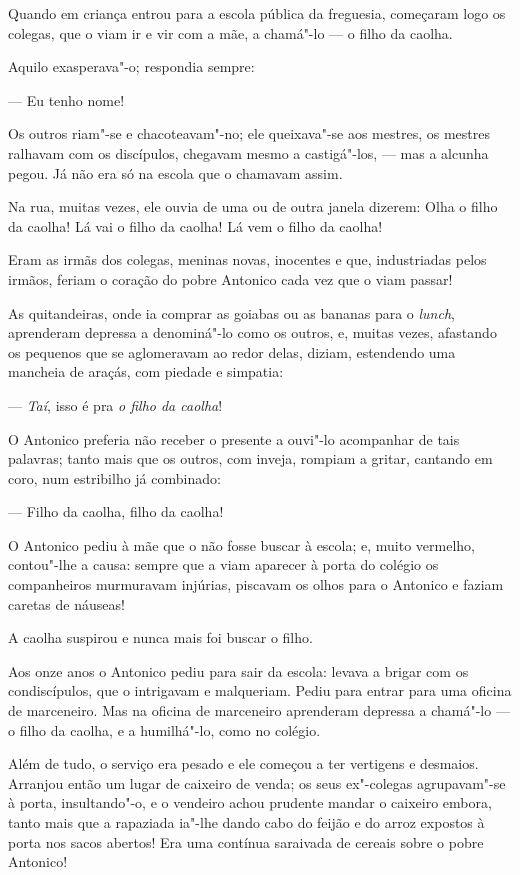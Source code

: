 Quando em criança entrou para a escola pública da freguesia, começaram
logo os colegas, que o viam ir e vir com a mãe, a chamá"-lo --- o filho
da caolha.

Aquilo exasperava"-o; respondia sempre:

--- Eu tenho nome!

Os outros riam"-se e chacoteavam"-no; ele queixava"-se aos mestres, os
mestres ralhavam com os discípulos, chegavam mesmo a castigá"-los, ---
mas a alcunha pegou. Já não era só na escola que o chamavam assim.

Na rua, muitas vezes, ele ouvia de uma ou de outra janela dizerem: Olha
o filho da caolha! Lá vai o filho da caolha! Lá vem o filho da caolha!

Eram as irmãs dos colegas, meninas novas, inocentes e que, industriadas
pelos irmãos, feriam o coração do pobre Antonico cada vez que o viam
passar!

As quitandeiras, onde ia comprar as goiabas ou as bananas para o
\emph{lunch}, aprenderam depressa a denominá"-lo como os outros, e,
muitas vezes, afastando os pequenos que se aglomeravam ao redor delas,
diziam, estendendo uma mancheia de araçás, com piedade e simpatia:

--- \emph{Taí}, isso é pra \emph{o filho da caolha}!

O Antonico preferia não receber o presente a ouvi"-lo acompanhar de tais
palavras; tanto mais que os outros, com inveja, rompiam a gritar,
cantando em coro, num estribilho já combinado:

--- Filho da caolha, filho da caolha!

O Antonico pediu à mãe que o não fosse buscar à escola; e, muito
vermelho, contou"-lhe a causa: sempre que a viam aparecer à porta do
colégio os companheiros murmuravam injúrias, piscavam os olhos para o
Antonico e faziam caretas de náuseas!

A caolha suspirou e nunca mais foi buscar o filho.

Aos onze anos o Antonico pediu para sair da escola: levava a brigar com
os condiscípulos, que o intrigavam e malqueriam. Pediu para entrar para
uma oficina de marceneiro. Mas na oficina de marceneiro aprenderam
depressa a chamá"-lo --- o filho da caolha, e a humilhá"-lo, como no
colégio.

Além de tudo, o serviço era pesado e ele começou a ter vertigens e
desmaios. Arranjou então um lugar de caixeiro de venda; os seus
ex"-colegas agrupavam"-se à porta, insultando"-o, e o vendeiro achou
prudente mandar o caixeiro embora, tanto mais que a rapaziada ia"-lhe
dando cabo do feijão e do arroz expostos à porta nos sacos abertos! Era
uma contínua saraivada de cereais sobre o pobre Antonico!

